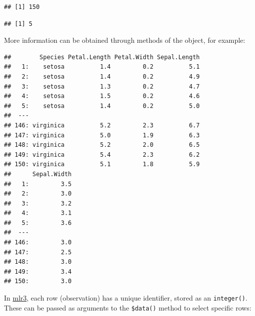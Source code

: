 \documentclass[]{article}
\newenvironment{Shaded}{\begin{snugshade}}{\end{snugshade}}
\newcommand{\KeywordTok}[1]{\textcolor[rgb]{0.13,0.29,0.53}{\textbf{#1}}}
\newcommand{\NormalTok}[1]{#1}
\newcommand{\OperatorTok}[1]{\textcolor[rgb]{0.81,0.36,0.00}{\textbf{#1}}}
\renewenvironment{Shaded} {\begin{snugshade}\small} {\end{snugshade}}
\begin{document}
\begin{Shaded}
\end{Shaded}

\begin{verbatim}
## [1] 150
\end{verbatim}

\begin{Shaded}
\end{Shaded}

\begin{verbatim}
## [1] 5
\end{verbatim}

More information can be obtained through methods of the object, for example:

\begin{Shaded}
\end{Shaded}

\begin{verbatim}
##        Species Petal.Length Petal.Width Sepal.Length
##   1:    setosa          1.4         0.2          5.1
##   2:    setosa          1.4         0.2          4.9
##   3:    setosa          1.3         0.2          4.7
##   4:    setosa          1.5         0.2          4.6
##   5:    setosa          1.4         0.2          5.0
##  ---                                                
## 146: virginica          5.2         2.3          6.7
## 147: virginica          5.0         1.9          6.3
## 148: virginica          5.2         2.0          6.5
## 149: virginica          5.4         2.3          6.2
## 150: virginica          5.1         1.8          5.9
##      Sepal.Width
##   1:         3.5
##   2:         3.0
##   3:         3.2
##   4:         3.1
##   5:         3.6
##  ---            
## 146:         3.0
## 147:         2.5
## 148:         3.0
## 149:         3.4
## 150:         3.0
\end{verbatim}

In \href{https://mlr3.mlr-org.com}{mlr3}, each row (observation) has a unique identifier, stored as an \texttt{integer()}.
These can be passed as arguments to the \texttt{\$data()} method to select specific rows:
\end{document}
